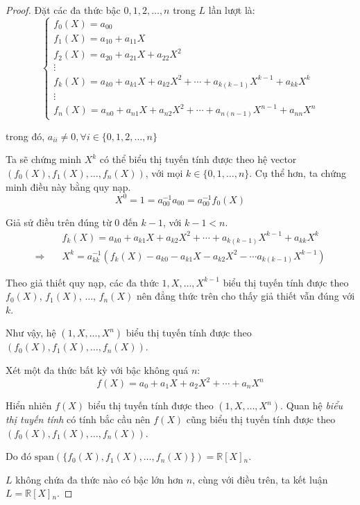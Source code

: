 \documentclass[class=linear-algebra,crop=false]{standalone}
\begin{document}
\begin{proof}Đặt các đa thức bậc $0, 1, 2,\ldots, n$ trong $L$ lần lượt là:
    \[
        \begin{cases}
            f_{0}(X) = a_{00}                                                                    \\
            f_{1}(X) = a_{10} + a_{11}X                                                          \\
            f_{2}(X) = a_{20} + a_{21}X + a_{22}X^{2}                                            \\
            \vdots                                                                               \\
            f_{k}(X) = a_{k0} + a_{k1}X + a_{k2}X^{2} + \cdots + a_{k(k-1)}X^{k-1} + a_{kk}X^{k} \\
            \vdots                                                                               \\
            f_{n}(X) = a_{n0} + a_{n1}X + a_{n2}X^{2} + \cdots + a_{n(n-1)}X^{n-1} + a_{nn}X^{n}
        \end{cases}
    \]
    \par trong đó, $a_{ii}\ne 0, \forall i\in\{0, 1, 2,\ldots, n\}$
    \par Ta sẽ chứng minh $X^{k}$ có thể biểu thị tuyến tính được theo hệ vector $(f_{0}(X), f_{1}(X), \ldots, f_{n}(X))$, với mọi $k\in\{0,1,\ldots, n\}$. Cụ thể hơn, ta chứng minh điều này bằng quy nạp.
    \[ X^{0} = 1 = a^{-1}_{00}a_{00} = a^{-1}_{00}f_{0}(X) \]
    \par Giả sử điều trên đúng từ $0$ đến $k-1$, với $k-1 < n$.
    \begin{align*}
                         & f_{k}(X) = a_{k0} + a_{k1}X + a_{k2}X^{2} + \cdots + a_{k(k-1)}X^{k-1} + a_{kk}X^{k}      \\
        \Rightarrow\quad & X^{k} = a^{-1}_{kk}(f_{k}(X) - a_{k0} - a_{k1}X - a_{k2}X^{2} - \cdots a_{k(k-1)}X^{k-1})
    \end{align*}
    \par Theo giả thiết quy nạp, các đa thức $1, X, \ldots, X^{k-1}$ biểu thị tuyến tính được theo $f_{0}(X)$, $f_{1}(X)$, $\ldots$, $f_{n}(X)$ nên đẳng thức trên cho thấy giả thiết vẫn đúng với $k$.
    \par Như vậy, hệ $(1, X, \ldots, X^{n})$ biểu thị tuyến tính được theo $(f_{0}(X), f_{1}(X), \ldots, f_{n}(X))$.
    \par Xét một đa thức bất kỳ với bậc không quá $n$:
    \[ f(X) = a_{0} + a_{1}X + a_{2}X^{2} + \cdots + a_{n}X^{n} \]
    \par Hiển nhiên $f(X)$ biểu thị tuyến tính được theo $(1, X, \ldots, X^{n})$. Quan hệ \textit{biểu thị tuyến tính} có tính bắc cầu nên $f(X)$ cũng biểu thị tuyến tính được theo $(f_{0}(X), f_{1}(X), \ldots, f_{n}(X))$.
    \par Do đó $\text{span}(\{f_{0}(X), f_{1}(X),\ldots, f_{n}(X)\}) = \mathbb{R}[X]{}_{n}$.
    \par $L$ không chứa đa thức nào có bậc lớn hơn $n$, cùng với điều trên, ta kết luận $L = \mathbb{R}[X]{}_{n}$.
\end{proof}
\end{document}
